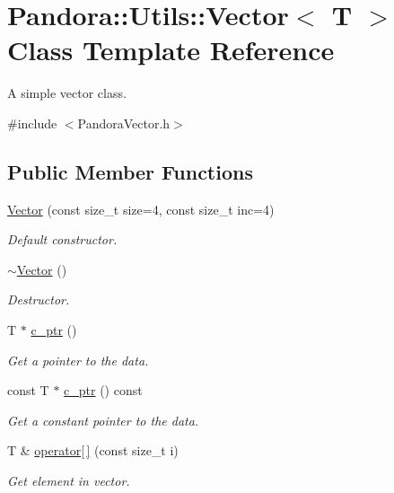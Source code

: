 \hypertarget{classPandora_1_1Utils_1_1Vector}{
\section{Pandora::Utils::Vector$<$ T $>$ Class Template Reference}
\label{classPandora_1_1Utils_1_1Vector}
}


A simple vector class.  


{\ttfamily \#include $<$PandoraVector.h$>$}\subsection*{Public Member Functions}
\begin{DoxyCompactItemize}
\item 
\hyperlink{classPandora_1_1Utils_1_1Vector_a08c4f102c57e56cabbca1c15e8c17122}{Vector} (const size\_\-t size=4, const size\_\-t inc=4)
\begin{DoxyCompactList}\small\item\em Default constructor. \item\end{DoxyCompactList}\item 
\hyperlink{classPandora_1_1Utils_1_1Vector_ab2688a6e46b857ad4756d21adadb0a20}{$\sim$Vector} ()
\begin{DoxyCompactList}\small\item\em Destructor. \item\end{DoxyCompactList}\item 
T $\ast$ \hyperlink{classPandora_1_1Utils_1_1Vector_a9760f625847909ad7dc45a71742bbcc9}{c\_\-ptr} ()
\begin{DoxyCompactList}\small\item\em Get a pointer to the data. \item\end{DoxyCompactList}\item 
const T $\ast$ \hyperlink{classPandora_1_1Utils_1_1Vector_a8ee2539ddb6b94eff47b6453143b2b83}{c\_\-ptr} () const 
\begin{DoxyCompactList}\small\item\em Get a constant pointer to the data. \item\end{DoxyCompactList}\item 
T \& \hyperlink{classPandora_1_1Utils_1_1Vector_adef2d8c160a9f9c2398f3c92f7874f4e}{operator\mbox{[}$\,$\mbox{]}} (const size\_\-t i)
\begin{DoxyCompactList}\small\item\em Get element in vector. \item\end{DoxyCompactList}\item 

\end{DoxyCompactItemize}
